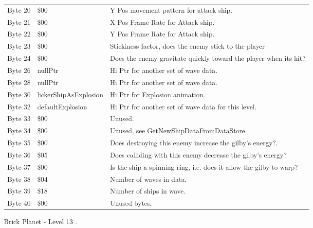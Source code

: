 \begin{figure}[H]
{\begin{adjustbox}{width=12cm}
\begin{tabular}{lll}
 Byte 20 & \$00                   & Y Pos movement pattern for attack ship.                            \\
 Byte 21 & \$00                   & X Pos Frame Rate for Attack ship.                                  \\
 Byte 22 & \$00                   & Y Pos Frame Rate for Attack ship.                                  \\
 Byte 23 & \$00                   & Stickiness factor, does the enemy stick to the player              \\
 Byte 24 & \$00                   & Does the enemy gravitate quickly toward the player when its hit?   \\
 Byte 26 & nullPtr               & Hi Ptr for another set of wave data.                               \\
 Byte 28 & nullPtr               & Hi Ptr for another set of wave data.                               \\
 Byte 30 & lickerShipAsExplosion & Hi Ptr for Explosion animation.                                    \\
 Byte 32 & defaultExplosion      & Hi Ptr for another set of wave data for this level.                \\
 Byte 33 & \$00                   & Unused.                                                            \\
 Byte 34 & \$00                   & Unused, see GetNewShipDataFromDataStore.                           \\
 Byte 35 & \$00                   & Does destroying this enemy increase the gilby's energy?.           \\
 Byte 36 & \$05                   & Does colliding with this enemy decrease the gilby's energy?        \\
 Byte 37 & \$00                   & Is the ship a spinning ring, i.e. does it allow the gilby to warp? \\
 Byte 38 & \$04                   & Number of waves in data.                                           \\
 Byte 39 & \$18                   & Number of ships in wave.                                           \\
 Byte 40 & \$00                   & Unused bytes.                                                      \\
\bottomrule
\end{tabular}

  \end{adjustbox}

  }\caption*{Brick Planet - Level 13
.}
\end{figure}

